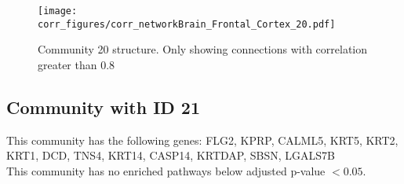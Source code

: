 \begin{figure}[h!]
\centering
\texttt{[image: corr\_figures/corr\_networkBrain\_Frontal\_Cortex\_20.pdf]}
\caption{Community 20 structure. Only showing connections with correlation greater than 0.8}
\end{figure}




\subsection*{Community with ID 21}
This community has the following genes: FLG2, KPRP, CALML5, KRT5, KRT2, KRT1, DCD, TNS4, KRT14, CASP14, KRTDAP, SBSN, LGALS7B
\\
This community has no enriched pathways below adjusted p-value $< 0.05$.

